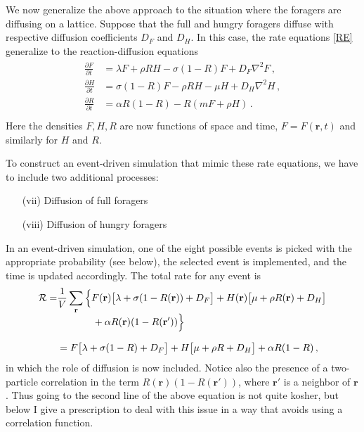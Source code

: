 \documentclass[11pt]{iopart}
\begin{document}
We now generalize the above approach to the situation where the foragers are
diffusing on a lattice.  Suppose that the full and hungry foragers diffuse
with respective diffusion coefficients $D_F$ and $D_H$.  In this case, the
rate equations \eqref{RE} generalize to the reaction-diffusion equations
\begin{align}
  \label{pde}
\begin{split}
\frac{\partial F}{\partial t} &= \lambda F + \rho  RH - \sigma (1-R)F+D_F\nabla^2F\,,\\[0.125in]
\frac{\partial H}{\partial t}  &= \sigma (1-R)F - \rho RH - \mu H+D_H\nabla^2H\,, \\[0.125in]
\frac{\partial R}{\partial t}  &= \alpha R(1-R) -  R(m F+\rho H)\,.\\
\end{split}
\end{align}
Here the densities $F,H,R$ are now functions of space and time,
$F=F(\mathbf{r},t)$ and similarly for $H$ and $R$.

To construct an event-driven simulation that mimic these rate equations, we
have to include two additional processes:
\begin{enumerate}
\item[(vii)] Diffusion of full foragers
\item[(viii)] Diffusion of hungry foragers
\end{enumerate}
In an event-driven simulation, one of the eight possible events is picked
with the appropriate probability (see below), the selected event is
implemented, and the time is updated accordingly.
The total rate for any event is
\begin{align}
\label{R}
\mathcal{R}=&\frac{1}{V}\sum_{\mathbf{r}}\Big\{F(\mathbf{r})\big[\lambda
  +\sigma(1-R(\mathbf{r}))+D_F\big]
+ H(\mathbf{r})\big[\mu+\rho R(\mathbf{r})+D_H\big]\Big.\nonumber \\[-0.05in]
&\Big.\hskip 0.5in
  +\alpha R(\mathbf{r})(1-R(\mathbf{r'}))\Big\}\,\nonumber
  \\[0.1in]
&=F\big[\lambda +\sigma(1-R)+D_F\big]
+ H\big[\mu+\rho R+D_H\big]+\alpha R(1-R)\,,
\end{align}
in which the role of diffusion is now included.  Notice also the presence of
a two-particle correlation in the term $R(\mathbf{r})(1-R(\mathbf{r}'))$,
where $\mathbf{r'}$ is a neighbor of $\mathbf{r}$.  Thus going to the second
line of the above equation is not quite kosher, but below I give a
prescription to deal with this issue in a way that avoids using a correlation
function.
\end{document}
